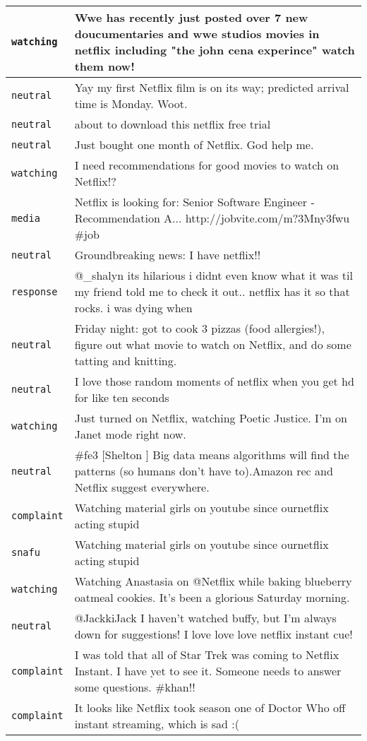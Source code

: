 {\begin{longtable}{|l|p{160mm}|}
      \tabularnewline\hline
         \texttt{watching} & Wwe has recently just posted over 7 new doucumentaries and wwe studios movies in netflix including "the john cena experince" watch them now!
      \tabularnewline\hline
         \texttt{neutral} & Yay my first Netflix film is on its way; predicted arrival time is Monday. Woot.
      \tabularnewline\hline
         \texttt{neutral} & about to download this netflix free trial
      \tabularnewline\hline
         \texttt{neutral} & Just bought one month of Netflix. God help me.
      \tabularnewline\hline
         \texttt{watching} & I need recommendations for good movies to watch on Netflix!?
      \tabularnewline\hline
         \texttt{media} & Netflix is looking for: Senior Software Engineer - Recommendation A... http://jobvite.com/m?3Mny3fwu \#job
      \tabularnewline\hline
         \texttt{neutral} & Groundbreaking news: I have netflix!!
      \tabularnewline\hline
         \texttt{response} & @\_shalyn its hilarious i didnt even know what it was til my friend told me to check it out.. netflix has it so that rocks. i was dying when
      \tabularnewline\hline
         \texttt{neutral} & Friday night: got to cook 3 pizzas (food allergies!), figure out what movie to watch on Netflix, and do some tatting and knitting.
      \tabularnewline\hline
         \texttt{neutral} & I love those random moments of netflix when you get hd for like ten seconds
      \tabularnewline\hline
         \texttt{watching} & Just turned on Netflix, watching Poetic Justice. I'm on Janet mode right now.
      \tabularnewline\hline
         \texttt{neutral} & \#fe3 [Shelton ] Big data means algorithms will find the patterns (so humans don't have to).Amazon rec and Netflix suggest everywhere.
      \tabularnewline\hline
         \texttt{complaint} & Watching material girls on youtube since ournetflix acting stupid
      \tabularnewline\hline
         \texttt{snafu} & Watching material girls on youtube since ournetflix acting stupid
      \tabularnewline\hline
         \texttt{watching} & Watching Anastasia on @Netflix while baking blueberry oatmeal cookies. It's been a glorious Saturday morning.
      \tabularnewline\hline
         \texttt{neutral} & @JackkiJack I haven't watched buffy, but I'm always down for suggestions! I love love love netflix instant cue!
      \tabularnewline\hline
         \texttt{complaint} & I was told that all of Star Trek was coming to Netflix Instant. I have yet to see it. Someone needs to answer some questions. \#khan!!
      \tabularnewline\hline
         \texttt{complaint} & It looks like Netflix took season one of Doctor Who off instant streaming, which is sad :(

\end{longtable}}
